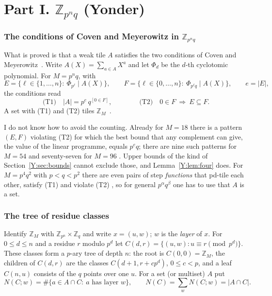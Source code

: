 \documentclass[11pt,a4paper]{amsart}
\theoremstyle{definition}
\theoremstyle{remark}
\newcommand{\Z}{\mathbb{Z}}
\begin{document}
\part*{Part I. \texorpdfstring{$\Z_{p^nq}$}{Z\_{p\^{}nq}} (Yonder)}

\section{The conditions of Coven and Meyerowitz in \texorpdfstring{$\Z_{p^nq}$}{p\^{}nq}}\label{Y:sec:cm}

What is proved is that a weak tile $A$ satisfies the two conditions of Coven and Meyerowitz~\cite{CM}. Write
$A(X)=\sum_{a\in A}X^a$ and let $\Phi_d$ be the $d$-th cyclotomic polynomial. For $M=p^nq$, with
\[
 E=\{\ell\in\{1,\dots,n\}:\ \Phi_{p^\ell}\mid A(X)\},\qquad
 F=\{\ell\in\{0,\dots,n\}:\ \Phi_{p^\ell q}\mid A(X)\},\qquad e=|E|,
\]
the conditions read
\[
 \text{(T1)}\quad |A|=p^{e}\,q^{[0\in F]},\qquad\qquad \text{(T2)}\quad 0\in F\ \Longrightarrow\ E\subseteq F .
\]
A set with (T1) and (T2) tiles $\Z_M$~\cite{CM}.


I do not know how to avoid the counting. Already for $M=18$ there is a pattern $(E,F)$ violating (T2) for which
the best bound that any complement can give, the value of the linear programme, equals $p^eq$; there are nine
such patterns for $M=54$ and seventy-seven for $M=96$ \cite{Ynote}. Upper bounds of the kind of Section~\ref{Y:sec:bounds} cannot exclude
those, and Lemma~\ref{Y:lem:four} does. For $M=p^4q^2$ with $p<q<p^2$ there are even pairs of step
\emph{functions} that pd-tile each other, satisfy (T1) and violate (T2) \cite[Theorem~1.4]{KLMS}, so for
general $p^\alpha q^\beta$ one has to use that $A$ is a set.

\section{The tree of residue classes}\label{Y:sec:tree}

Identify $\Z_M$ with $\Z_{p^n}\times\Z_q$ and write $x=(u,w)$; $w$ is the \emph{layer} of $x$. For $0\le d\le n$
and a residue $r$ modulo $p^d$ let $C(d,r)=\{(u,w): u\equiv r \pmod{p^d}\}$. These classes form a $p$-ary tree
of depth $n$: the root is $C(0,0)=\Z_M$, the children of $C(d,r)$ are the classes $C(d+1,r+cp^d)$,
$0\le c<p$, and a leaf $C(n,u)$ consists of the $q$ points over one $u$. For a set (or multiset) $A$ put
\[
 N(C;w)=\#\{a\in A\cap C:\ a \text{ has layer } w\},\qquad N(C)=\sum_w N(C;w)=|A\cap C| .
\]
\end{document}
